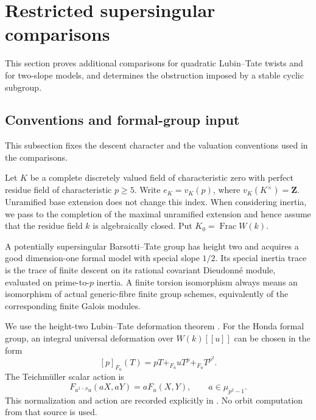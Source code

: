 \section{Restricted supersingular comparisons}\label{sec:restricted}
This section proves additional comparisons for quadratic Lubin--Tate twists and for two-slope models, and determines the obstruction imposed by a stable cyclic subgroup.
\subsection{Conventions and formal-group input}
This subsection fixes the descent character and the valuation conventions used in the comparisons.


Let $K$ be a complete discretely valued field of characteristic zero with
perfect residue field of characteristic $p\geq5$. Write $e_K=v_K(p)$, where
$v_K(K^\times)=\mathbf Z$. Unramified base extension does not change this
index. When considering inertia, we pass to the completion of the maximal
unramified extension and hence assume that the residue field $k$ is
algebraically closed. Put $K_0=\operatorname{Frac} W(k)$.

A potentially supersingular Barsotti--Tate group has height two and acquires
a good dimension-one formal model with special slope $1/2$. Its special
inertia trace is the trace of finite descent on its rational covariant
Dieudonn\'e module, evaluated on prime-to-$p$ inertia. A finite torsion
isomorphism always means an isomorphism of actual generic-fibre finite
group schemes, equivalently of the corresponding finite Galois modules.

We use the height-two Lubin--Tate deformation theorem
\citep{LT1966}. For the Honda formal group, an integral universal deformation
over $W(k)[[u]]$ can be chosen in the form
\begin{equation}\label{rc-eq:ptypical}
 [p]_{F_u}(T)=pT+_{F_u}uT^p+_{F_u}T^{p^2}.
\end{equation}
The Teichm\"uller scalar action is
\begin{equation}\label{rc-eq:scalar}
 F_{a^{1-p}u}(aX,aY)=aF_u(X,Y),\qquad
 a\in\mu_{p^2-1}.
\end{equation}
This normalization and action are recorded explicitly in
\citet[\S2.1]{BDMMRR2019}. No orbit computation from that source is used.

